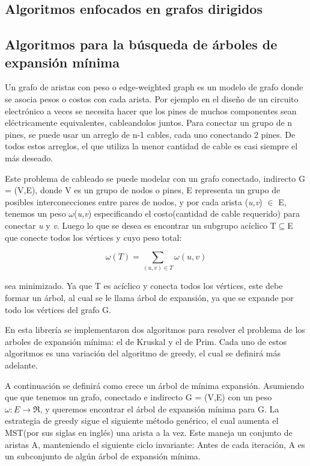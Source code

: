 \documentclass[a4paper, 11pt]{report}
\begin{document}
\subsection{Algoritmos enfocados en grafos dirigidos}
\newpage
\subsection{Algoritmos para la b\'usqueda de \'arboles de expansi\'on m\'inima}
Un grafo de aristas con peso o edge-weighted graph es un modelo de grafo donde se asocia pesos o costos con cada arista. Por ejemplo en el diseño de un circuito electrónico a veces se necesita hacer que los pines  de muchos componentes sean eléctricamente equivalentes, cableandolos juntos. Para conectar un grupo de n pines, se puede usar un arreglo de n-1 cables, cada uno conectando 2 pines. De todos estos arreglos, el que utiliza la menor cantidad de cable es casi siempre el más deseado. 

Este problema de cableado se puede modelar con un grafo conectado, indirecto G = (V,E), donde V es un grupo de nodos o pines, E representa un grupo de posibles interconecciones entre pares de nodos, y por cada arista (\textit{u,v}) $\in$  E, tenemos un peso $\omega$(\textit{u,v}) especificando el costo(cantidad de cable requerido) para conectar \textit{u} y \textit{v}. Luego lo que se desea es encontrar un subgrupo acíclico T$ \subseteq $E que conecte todos los vértices y cuyo peso total:

\begin{equation}
 \omega (T) =  \sum_{(u,v) \in T}  \omega (u,v) 
\end{equation}

sea minimizado. Ya que T es acíclico y conecta todos los vértices, este debe formar un árbol, al cual se le llama árbol de expansión, ya que se expande por todo los vértices del grafo G. 

En esta librería se implementaron dos algoritmos para resolver el problema de los arboles de expansión mínima: el de Kruskal y el de Prim. Cada uno de estos algoritmos es una variación del algoritmo de greedy, el cual se definirá más adelante. 

A continuación se definirá como crece un árbol de mínima expansión. Asumiendo que que tenemos un grafo, conectado e indirecto G = (V,E) con un peso $\omega: E \longrightarrow  \Re$, y queremos encontrar el árbol de expansión mínima para G. La estrategia de greedy sigue el siguiente método genérico, el cual aumenta el MST(por sus siglas en inglés) una arista a la vez. Este maneja un conjunto de aristas A, manteniendo el siguiente ciclo invariante: Antes de cada iteración, A es un subconjunto de algún árbol de expansión mínima.
\end{document}
